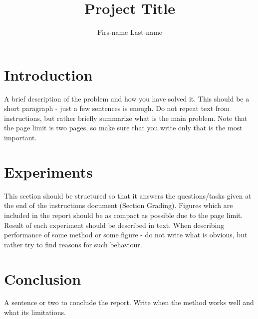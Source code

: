 \documentclass[9pt]{IEEEtran}
\title{\vspace{0ex}
Project Title}
\author{Firs-name Last-name\vspace{-4.0ex}}
\begin{document}
\maketitle

\section{Introduction}

A brief description of the problem and how you have solved it. This should be a short paragraph - just a few sentences is enough.
Do not repeat text from instructions, but rather briefly summarize what is the main problem.
Note that the page limit is two pages, so make sure that you write only that is the most important.

\section{Experiments}

This section should be structured so that it answers the questions/tasks given at the end of the instructions document (Section Grading). 
Figures which are included in the report should be as compact as possible due to the page limit.
Result of each experiment should be described in text. When describing performance of some method or some figure - do not write what is obvious, but rather try to find reasons for such behaviour.


\section{Conclusion}

A sentence or two to conclude the report. Write when the method works well and what its limitations.



\end{document}

